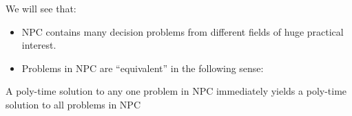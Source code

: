 We will see that:
\begin{itemize}
\item NPC contains many decision problems from different fields of huge practical interest.
\item Problems in NPC are ``equivalent'' in the following sense:
\end{itemize}
A poly-time solution to any one problem in NPC immediately yields a poly-time solution to all problems in NPC
